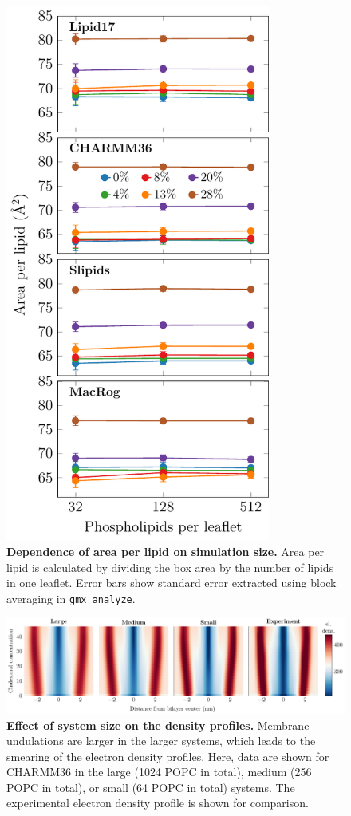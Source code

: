 \documentclass[journal=jpcbfk,manuscript=suppinfo]{achemso}
\begin{document}
\begin{figure}[htb!]
    \centering
    \includegraphics[width=8.7cm]{../FIGS/apl_vs_size.pdf}
    \caption{\label{SIfig:aplvssize}%
     \textbf{Dependence of area per lipid on simulation size.} Area per lipid is calculated by dividing the box area by the number of lipids in one leaflet. Error bars show standard error extracted using block averaging in \texttt{gmx analyze}.
    }
\end{figure}

\begin{figure}[htb!]
    \centering
    \includegraphics[width=\linewidth]{../FIGS/densityprofiles_size.pdf}
    \caption{\label{SIfig:densprofssize}%
    \textbf{Effect of system size on the density profiles.}
    Membrane undulations are larger in the larger systems, which leads to the smearing of the electron density profiles. Here, data are shown for CHARMM36 in the large (1024 POPC in total), medium (256 POPC in total), or small (64 POPC in total) systems. The experimental electron density profile is shown for comparison.
    }
\end{figure}

\clearpage



\end{document}

